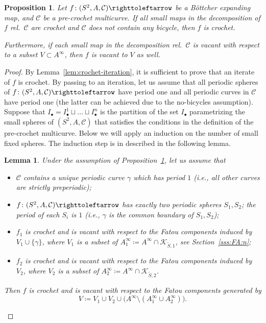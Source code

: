 \documentclass{amsart}
\theoremstyle{plain}
\newtheorem{lemma}[theorem]{Lemma}
\newtheorem{proposition}[theorem]{Proposition}
\theoremstyle{definition}
\theoremstyle{remark}
\newcommand{\filled}{{\mathcal K}}
\newcommand{\CC}{{\mathcal C}}
\newcommand\selfmap{\righttoleftarrow}
\begin{document}
\begin{proposition}\label{prop: gluing crochet}
Let $f\colon (S^2,A,\CC)\selfmap$ be a B\"ottcher expanding map, and $\CC$ be a pre-crochet multicurve. If all small maps in the decomposition of $f$ rel.\ $\CC$ are crochet and $\CC$ does not contain any bicycle, then $f$ is crochet. 

Furthermore, if each small map in the decomposition rel.\ $\CC$ is vacant with respect to a subset $V\subset A^\infty$, then $f$ is vacant to $V$ as well. 
\end{proposition}
\begin{proof} 
By Lemma~\ref{lem:crochet-iteration}, it is sufficient to prove that an iterate of $f$ is crochet. By passing to an iteration, let us assume that all periodic spheres of $f\colon (S^2,A,\CC)\selfmap$ have period one and all periodic curves in $\CC$ have period one (the latter can be achieved due to the no-bicycles assumption). Suppose that $I_\bullet=I_\bullet^1\sqcup\dots \sqcup I_\bullet^n$ is the partition of the set $I_\bullet$ parametrizing the small spheres of $(S^2,A,\CC)$ that satisfies the conditions in the definition of the pre-crochet multicurve. Below we will apply an induction on the number of small fixed spheres. The induction step is in described in the following lemma. 

\begin{lemma}
\label{lem:glunig crochet:induction}
Under the assumption of Proposition~\ref{prop: gluing crochet}, let us assume that 
\begin{itemize}
\item $\CC$ contains a unique periodic curve $\gamma$ which has period $1$ (i.e., all other curves are strictly preperiodic);
\item $f\colon (S^2,A,\CC)\selfmap$ has exactly two periodic spheres $S_1,S_2$; the period of each $S_i$ is $1$ (i.e., $\gamma$ is the common boundary of $S_1,S_2$);
\item $f_1$ is crochet and is vacant with respect to the Fatou components induced by $V_1\cup \{\gamma\}$, where $V_1$ is a subset of $A^\infty_{1}\coloneq A^\infty \cap \filled_{\widetilde S,1}$, see Section~\ref{sss:FA:n};
\item $f_2$ is crochet and is vacant with respect to the Fatou components induced by $V_2$, where $V_2$ is a subset of $A^\infty_{2}\coloneq A^\infty \cap \filled_{\widetilde S,2}$.
\end{itemize}


Then $f$ is crochet and is vacant with respect to the Fatou components generated by \[V\coloneq V_1\cup V_2\cup \big(A^\infty\setminus (A^\infty_{1}\cup A^\infty_{2})\big).\]
\end{lemma}


\end{proof}
\end{document}
